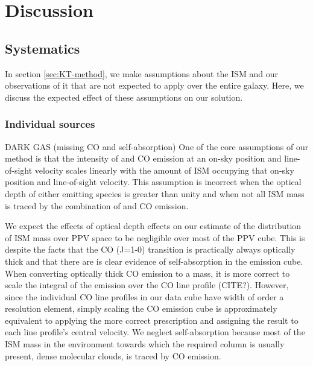 \section{Discussion}
\label{sec:discussion}

\subsection{Systematics}
\label{sec:discussion-systematics}
In section \ref{sec:KT-method}, we make assumptions about the ISM and our observations of it that are not expected to apply over the entire galaxy. Here, we discuss the expected effect of these assumptions on our solution.
\subsubsection{Individual sources}
DARK GAS (missing CO and \atomH self-absorption)
One of the core assumptions of our method is that the intensity of \atomH and CO emission at an on-sky position and line-of-sight velocity scales linearly with the amount of ISM occupying that on-sky position and line-of-sight velocity. This assumption is incorrect when the optical depth of either emitting species is greater than unity and when not all ISM mass is traced by the combination of \atomH and CO emission. 

We expect the effects of optical depth effects on our estimate of the distribution of ISM mass over PPV space to be negligible over most of the PPV cube. This is despite the facts that the CO (J=1-0) transition is practically always optically thick and that there are is clear evidence of \atomH self-absorption in the \atomH emission cube. When converting optically thick CO emission to a \molH mass, it is more correct to scale the integral of the emission over the CO line profile (CITE?). However, since the individual CO line profiles in our data cube have width of order a resolution element, simply scaling the CO emission cube is approximately equivalent to applying the more correct prescription and assigning the result to each line profile's central velocity. We neglect \atomH self-absorption because most of the ISM mass in the environment towards which the required \atomH column is usually present, dense molecular clouds, is traced by CO emission. 

